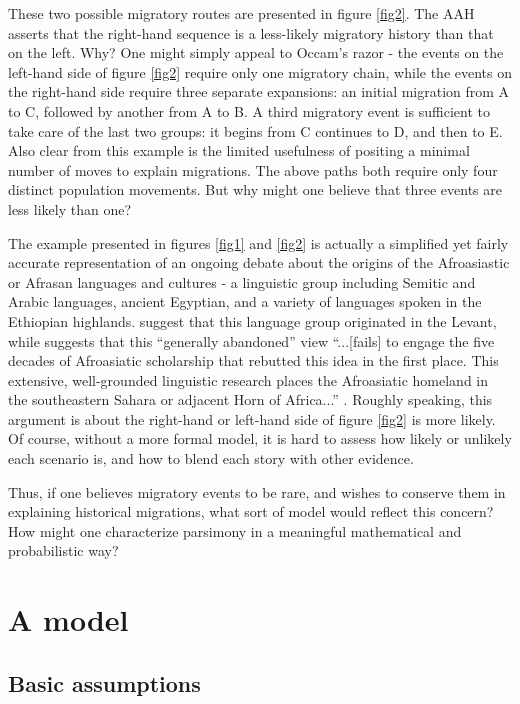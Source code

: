 \documentclass[11pt]{article}
\begin{document}
These two possible migratory routes are presented in figure \ref{fig2}. The AAH asserts that the right-hand sequence is a less-likely migratory history than that on the left. Why? One might simply appeal to Occam's razor - the events on the left-hand side of figure \ref{fig2} require only one migratory chain, while the events on the right-hand side require three separate expansions: an initial migration from A to C, followed by another from A to B. A third migratory event is sufficient to take care of the last two groups: it begins from C continues to D, and then to E. Also clear from this example is the limited usefulness of positing a minimal number of moves to explain migrations. The above paths both require only four distinct population movements. But why might one believe that three events are less likely than one? 

The example presented in figures \ref{fig1} and \ref{fig2} is actually a simplified yet fairly accurate representation of an ongoing debate about the origins of the Afroasiastic or Afrasan languages and cultures - a linguistic group including Semitic and Arabic languages, ancient Egyptian, and a variety of languages spoken in the Ethiopian highlands. \cite{diamond03} suggest that this language group originated in the Levant, while \cite{ehret04} suggests that this ``generally abandoned'' view ``...[fails] to engage the five decades of Afroasiatic scholarship that rebutted this idea in the first place. This extensive, well-grounded linguistic research places the Afroasiatic homeland in the southeastern Sahara or adjacent Horn of Africa...'' \citep[p. 1680]{ehret04}. Roughly speaking, this argument is about the right-hand or left-hand side of figure \ref{fig2} is more likely. Of course, without a more formal model, it is hard to assess how likely or unlikely each scenario is, and how to blend each story with other evidence. 

Thus,  if one believes migratory events to be rare, and wishes to conserve them in explaining historical migrations, what sort of model would reflect this concern? How might one characterize parsimony in a meaningful mathematical and probabilistic way? 

\section{A model}

\subsection{Basic assumptions }
\end{document}
